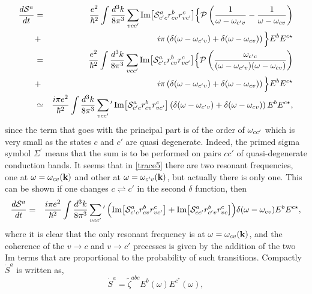 \documentclass[floatfix,prb,aps,superscriptaddress,11pt]{revtex4}
\begin{document}
\begin{eqnarray}\label{trace5}
\frac{d{\cal S}^a}{dt}
&=&
\frac{e^2}{\hbar^2}
\int\frac{d^3k}{8\pi^3}
\sum_{vcc'}
\mbox{Im}\big[
{\cal S}^a_{c'c}r^b_{cv}r^c_{vc'}
\big]
\Big\{
{\cal P}\left(
\frac{1}{\omega-\omega_{c'v}}
-
\frac{1}
{\omega-\omega_{cv}}
\right)
\nonumber\\
&+&
i\pi
\left(
\delta(\omega-\omega_{c'v})
+
\delta(\omega-\omega_{cv})
\right)
\Big\}
E^bE^{c\star}
\nonumber\\
&=&
\frac{e^2}{\hbar^2}
\int\frac{d^3k}{8\pi^3}
\sum_{vcc'}
\mbox{Im}\big[
{\cal S}^a_{c'c}r^b_{cv}r^c_{vc'}
\big]
\Big\{
{\cal P}\left(
\frac{\omega_{c'c}}{(\omega-\omega_{c'v})(\omega-\omega_{cv})}
\right)  
\nonumber\\
&+& 
i\pi  
\left(
\delta(\omega-\omega_{c'v})  
+
\delta(\omega-\omega_{cv})  
\right)  
\Big\} 
E^bE^{c\star}
\nonumber\\
&\simeq&
\frac{i\pi e^2}{\hbar^2}
\int\frac{d^3k}{8\pi^3}
\sum_{vcc'}\phantom{}^\prime\,
\mbox{Im}\big[
{\cal S}^a_{c'c}r^b_{cv}r^c_{vc'}
\big]
\left(
\delta(\omega-\omega_{c'v})
+
\delta(\omega-\omega_{cv})
\right)
E^bE^{c\star}
,
\end{eqnarray}
since the term that goes with the principal part is of the order of
$\omega_{cc'}$ which is very small as the states $c$ and $c'$ are quasi
degenerate. Indeed,
the primed sigma symbol $\Sigma^\prime$ means that the sum is
to be performed on pairs $cc'$ of quasi-degenerate conduction bands.
It seems that in \ref{trace5} there are two resonant frequencies,
one at $\omega=\omega_{cv}(\mathbf{k})$ and other at
$\omega=\omega_{c'v}(\mathbf{k})$, but actually there is only one. This can
be shown if one changes $c\rightleftharpoons c'$
in the second $\delta$ function, then
\begin{eqnarray}\label{trace51}
\frac{d{\cal S}^a}{dt}
&=&
\frac{i\pi e^2}{\hbar^2}
\int\frac{d^3k}{8\pi^3}
\sum_{vcc'}\phantom{}^\prime\,
\Big(
\mbox{Im}\big[
{\cal S}^a_{c'c}r^b_{cv}r^c_{vc'}
\big]
+
\mbox{Im}\big[
{\cal S}^a_{cc'}r^b_{c'v}r^c_{vc}
\big]
\Big)
\delta(\omega-\omega_{cv})
E^bE^{c\star}
,
\end{eqnarray}
where it is clear that the only resonant frequency is at
$\omega=\omega_{cv}(\mathbf{k})$, and the coherence of the $v\to c$ and
$v\to c'$ precesses is given by the addition of the two Im terms that
are proportional to the probability of such transitions. 
Compactly $\dot{S}^a$ is written as, 
\begin{equation}
\label{eq:29}
 \dot{S}^a =
\tilde\zeta^{abc}
E^b(\omega)
E^{c^*}(\omega)
,
\end{equation}
\end{document}
